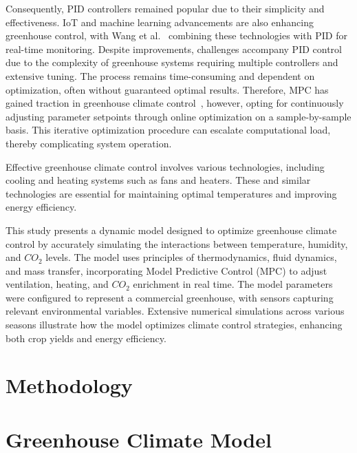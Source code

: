 \documentclass[conference]{IEEEtran}
\begin{document}
Consequently, PID controllers remained popular due to their simplicity and effectiveness. IoT and machine learning advancements are also enhancing greenhouse control, with Wang et al.~\cite{Wang2024} combining these technologies with PID for real-time monitoring. Despite improvements, challenges accompany PID control due to the complexity of greenhouse systems requiring multiple controllers and extensive tuning. The process remains time-consuming and dependent on optimization, often without guaranteed optimal results. Therefore, MPC has gained traction in greenhouse climate control~\cite{Hu2022}, however, opting for continuously adjusting parameter setpoints through online optimization on a sample-by-sample basis. This iterative optimization procedure can escalate computational load, thereby complicating system operation.



Effective greenhouse climate control involves various technologies, including cooling and heating systems such as fans and heaters. These and similar technologies are essential for maintaining optimal temperatures and improving energy efficiency.

This study presents a dynamic model designed to optimize greenhouse climate control by accurately simulating the interactions between temperature, humidity, and $CO_2$ levels. The model uses principles of thermodynamics, fluid dynamics, and mass transfer, incorporating Model Predictive Control (MPC) to adjust ventilation, heating, and $CO_2$ enrichment in real time. The model parameters were configured to represent a commercial greenhouse, with sensors capturing relevant environmental variables. Extensive numerical simulations across various seasons illustrate how the model optimizes climate control strategies, enhancing both crop yields and energy efficiency.


\section{Methodology}

\section{Greenhouse Climate Model}
\end{document}
